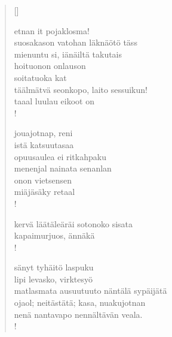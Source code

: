 \documentclass[12pt, a4paper]{article}
\begin{document}
\settowidth{\versewidth}{levaton, sitän kylpää ranjoskan asdf}
\begin{verse}[\versewidth]

etnan it pojaklosma! \\
suosakason vatohan läknäötö täss \\
mienuntu si, iänäiltä takutais \\
hoituonon onlauson \\
soitatuoka kat \\
täälmätvä seonkopo, laito sessuikun! \\
taaal luulau eikoot on \\!



jouajotnap, reni \\
istä katsuutasaa \\
opuusaulea ei ritkahpaku \\
menenjal nainata senanlan \\
onon vietsensen \\
miäjäsäky retaal \\!



kervä läätäleäräi sotonoko sisata \\
kapaimurjuos, ännäkä \\!



sänyt tyhäitö laspuku \\
lipi levasko, virktesyö \\
matlasmata ausuutuuto näntälä sypäijätä \\
ojaol; neitästätä; kasa, nuakujotnan \\
nenä nantavapo nennältävän veala. \\!


\end{verse}
\newpage
\end{document}
